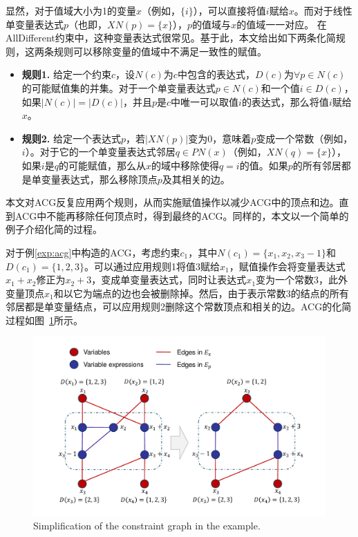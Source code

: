 显然，对于值域大小为1的变量$x$（例如，$\{i\}$），可以直接将值$i$赋给$x$。而对于线性单变量表达式$p$（也即，$XN(p) = \{x\}$），$p$的值域与$x$的值域一一对应。
在AllDifferent约束中，这种变量表达式很常见。基于此，本文给出如下两条化简规则，这两条规则可以移除变量的值域中不满足一致性的赋值。
\begin{itemize}
\renewcommand{\labelenumi}{}
    \item \textbf{规则1.} 给定一个约束$c$，设$N(c)$为$c$中包含的表达式，$D(c)$为$\forall p \in N(c)$的可能赋值集的并集。对于一个单变量表达式$p \in N(c)$和一个值$i \in D(c)$，如果$|N(c)| = |D(c)|$，并且$p$是$c$中唯一可以取值$i$的表达式，那么将值$i$赋给$x$。
    \item \textbf{规则2.} 给定一个表达式$p$，若$|XN(p)|$变为0，意味着$p$变成一个常数（例如，$i$）。对于它的一个单变量表达式邻居$q \in PN(x)$（例如，$XN(q)=\{x\}$），如果$i$是$q$的可能赋值，那么从$x$的域中移除使得$q=i$的值。如果$p$的所有邻居都是单变量表达式，那么移除顶点$p$及其相关的边。
\end{itemize}

本文对ACG反复应用两个规则，从而实施赋值操作以减少ACG中的顶点和边。直到ACG中不能再移除任何顶点时，得到最终的ACG。同样的，本文以一个简单的例子介绍化简的过程。
\begin{example}
    对于例\ref{exp:acg}中构造的ACG，考虑约束$c_1$，其中$N(c_1)=\{x_1, x_2, x_3-1\}$和$D(c_1)=\{1, 2, 3\}$。可以通过应用规则1将值3赋给$x_1$，赋值操作会将变量表达式$x_1+x_2$修正为$x_2+3$，变成单变量表达式，同时让表达式$x_1$变为一个常数3，此外变量顶点$x_1$和以它为端点的边也会被删除掉。然后，由于表示常数3的结点的所有邻居都是单变量结点，可以应用规则2删除这个常数顶点和相关的边。ACG的化简过程如图~\ref{fig:simp}所示。
\end{example}

\begin{figure}[]
    \centering
    \includegraphics[width=\columnwidth]{Img/simp.pdf}
     {Simplification of the constraint graph in the example.}
    \label{fig:simp}
\end{figure}

